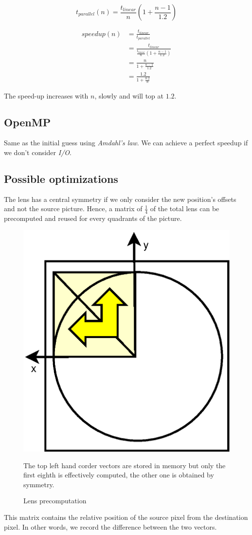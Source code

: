 \documentclass[10pt,a4paper]{article}
\begin{document}
$$t_{parallel}(n) = \frac{t_{linear}}{n}(1 + \frac{n - 1}{1.2})$$

\begin{align*}
speedup(n) &= \frac{t_{linear}}{t_{parallel}} \\
        &= \frac{t_{linear}}{\frac{t_{linear}}{n}(1 + \frac{n - 1}{1.2})} \\
        &= \frac{n}{1 + \frac{n - 1}{1.2}} \\
        &= \frac{1.2}{1 + \frac{0.2}{n}}
\end{align*}

The speed-up increases with $n$, slowly and will top at $1.2$.

\subsection{OpenMP}
Same as the initial guess using \emph{Amdahl's law}. We can achieve a perfect
speedup if we don't consider \emph{I/O}.

\subsection{Possible optimizations}
The lens has a central symmetry if we only consider the new position's offsets
and not the source picture. Hence, a matrix of $\frac{1}{4}$ of the total lens
can be precomputed and reused for every quadrants of the picture.

\begin{figure}[h]
    \centering
    \includegraphics[width=0.3\linewidth]{../figures/lens.eps}
    \caption{Lens precomputation}{The top left hand corder vectors are stored
    in memory but only the first eighth is effectively computed, the other one
    is obtained by symmetry.}
    \label{fig:lens}
\end{figure}

This matrix contains the relative position of the source pixel from the
destination pixel.  In other words, we record the difference between the two
vectors.
\end{document}

